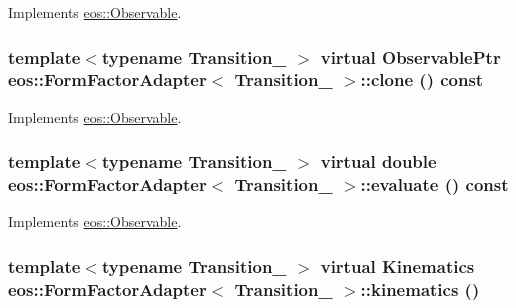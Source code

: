 Implements \hyperlink{classeos_1_1Observable_a20e8218d04aa5589ce795ddd425751a0}{eos::Observable}.\hypertarget{classeos_1_1FormFactorAdapter_a85c062dbc8dd32bb25299fbab92110f5}{
\subsubsection[{clone}]{\setlength{\rightskip}{0pt plus 5cm}template$<$typename Transition\_\- $>$ virtual {\bf ObservablePtr} {\bf eos::FormFactorAdapter}$<$ Transition\_\- $>$::clone () const}}
\label{classeos_1_1FormFactorAdapter_a85c062dbc8dd32bb25299fbab92110f5}


Implements \hyperlink{classeos_1_1Observable_a1c88c66a224a14fbddad70e95cb61136}{eos::Observable}.\hypertarget{classeos_1_1FormFactorAdapter_ad14dd267ae5fcbe9b739d438904ce959}{
\subsubsection[{evaluate}]{\setlength{\rightskip}{0pt plus 5cm}template$<$typename Transition\_\- $>$ virtual double {\bf eos::FormFactorAdapter}$<$ Transition\_\- $>$::evaluate () const}}
\label{classeos_1_1FormFactorAdapter_ad14dd267ae5fcbe9b739d438904ce959}


Implements \hyperlink{classeos_1_1Observable_a913385d3a077d578bbcc2d502e5fdc2d}{eos::Observable}.\hypertarget{classeos_1_1FormFactorAdapter_ae4fc137cd1c8b5703ffd6986e9ce739b}{
\subsubsection[{kinematics}]{\setlength{\rightskip}{0pt plus 5cm}template$<$typename Transition\_\- $>$ virtual {\bf Kinematics} {\bf eos::FormFactorAdapter}$<$ Transition\_\- $>$::kinematics ()}}
\label{classeos_1_1FormFactorAdapter_ae4fc137cd1c8b5703ffd6986e9ce739b}


